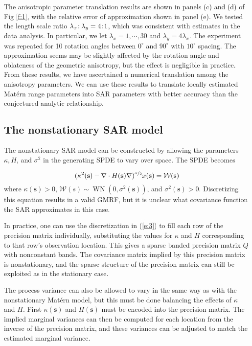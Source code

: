 \documentclass[review]{elsarticle}
\begin{document}
The anisotropic parameter translation results are shown in panels (c) and (d) of Fig \ref{f:1}, with the relative error of approximation shown in panel (e). We tested the length scale ratio $\lambda_x \colon \hspace{-0.4mm}  \lambda_y = 4 \colon \hspace{-1mm} 1$, which was consistent with estimates in the data analysis. In particular, we let $\lambda_x = 1, \cdots, 30$ and $\lambda_y = 4\lambda_x$. The experiment was repeated for 10 rotation angles between $0^{\circ}$ and $90^{\circ}$ with $10^{\circ}$ spacing. The approximation seems may be slightly affected by the rotation angle and oblateness of the geometric anisotropy, but the effect is negligible in practice. From these results, we have ascertained a numerical translation among the anisotropy parameters. We can use these results to translate locally estimated Mat\'ern range parameters into SAR parameters with better accuracy than the conjectured analytic relationship.









\subsection{The nonstationary SAR model}

The nonstationary SAR model can be constructed by allowing the parameters $\kappa, H$, and $\sigma^2$ in the generating SPDE to vary over space. The SPDE becomes

$$ (\kappa^2(\mathbf s) - \nabla \cdot H(\mathbf s) \nabla)^{\nicefrac{\alpha}{2}} x(\mathbf s) = \mathcal{W}(\mathbf s) $$
where $\kappa(\mathbf s) > 0$, $\mathcal{W}(s) \sim \operatorname{WN}(0, \sigma^2(\mathbf s))$, and $\sigma^2(\mathbf s) > 0$. Discretizing this equation results in a valid GMRF, but it is unclear what covariance function the SAR approximates in this case.

In practice, one can use the discretization in (\ref{e:3}) to fill each row of the precision matrix individually, substituting the values for $\kappa$ and $H$ corresponding to that row's observation location. This gives a sparse banded precision matrix $Q$ with nonconstant bands. The covariance matrix implied by this precision matrix is nonstationary, and the sparse structure of the precision matrix can still be exploited as in the stationary case.

The process variance can also be allowed to vary in the same way as with the nonstationary Mat\'ern model, but this must be done balancing the effects of $\kappa$ and $H$. First $\kappa(\mathbf s)$ and $H(\mathbf s)$ must be encoded into the precision matrix. The implied marginal variances can then be computed for each location from the inverse of the precision matrix, and these variances can be adjusted to match the estimated marginal variance. 
\end{document}
